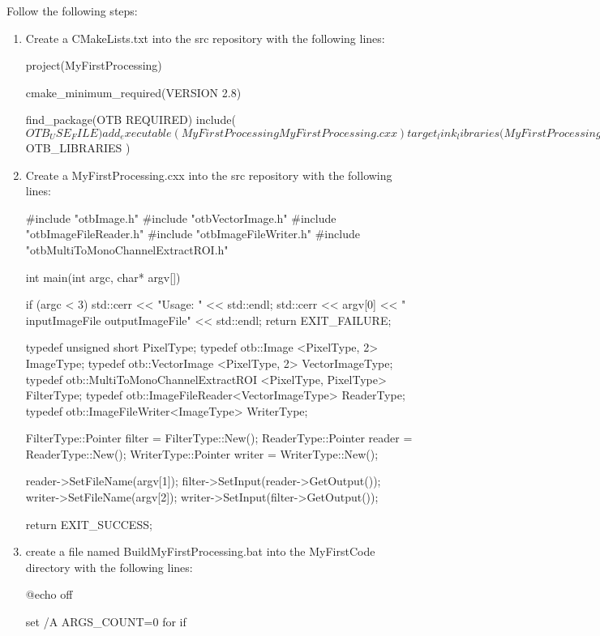 Follow the following steps:
\begin{enumerate}
\item Create a CMakeLists.txt into the src repository with the following lines:


\begin{cmakecode}
project(MyFirstProcessing)

cmake_minimum_required(VERSION 2.8)

find_package(OTB REQUIRED)
include(${OTB_USE_FILE})

add_executable(MyFirstProcessing MyFirstProcessing.cxx )

target_link_libraries(MyFirstProcessing ${OTB_LIBRARIES} )
\end{cmakecode}

\item Create a MyFirstProcessing.cxx into the src repository with the following lines:

\begin{cppcode}
#include "otbImage.h"
#include "otbVectorImage.h"
#include "otbImageFileReader.h"
#include "otbImageFileWriter.h"
#include "otbMultiToMonoChannelExtractROI.h"

int main(int argc, char* argv[])
{
  if (argc < 3)
  {
    std::cerr << "Usage: " << std::endl;
    std::cerr << argv[0] << "  inputImageFile  outputImageFile" << std::endl;
    return EXIT_FAILURE;
  }

  typedef unsigned short PixelType;
  typedef otb::Image <PixelType, 2> ImageType;
  typedef otb::VectorImage <PixelType, 2> VectorImageType;
  typedef otb::MultiToMonoChannelExtractROI <PixelType, PixelType> FilterType;
  typedef otb::ImageFileReader<VectorImageType> ReaderType;
  typedef otb::ImageFileWriter<ImageType> WriterType;

  FilterType::Pointer filter = FilterType::New();
  ReaderType::Pointer reader = ReaderType::New();
  WriterType::Pointer writer = WriterType::New();

  reader->SetFileName(argv[1]);
  filter->SetInput(reader->GetOutput());
  writer->SetFileName(argv[2]);
  writer->SetInput(filter->GetOutput());

  return EXIT_SUCCESS;
}
\end{cppcode}
\item create a file named BuildMyFirstProcessing.bat into the MyFirstCode directory with the following lines:
\begin{batcode}
@echo off

set /A ARGS_COUNT=0    
for %
if %


\end{batcode}
\end{enumerate}
